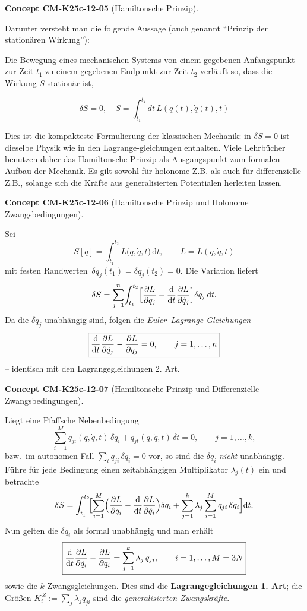 \documentclass[10pt, letterpaper]{article}
\newcommand{\CustomHeading}[3]{%
  \par\medskip\noindent%
  \textbf{#1 #2} \textnormal{(#3)}.\enskip%
}
\newenvironment{CONC}[2]{\CustomHeading{Concept}{#1}{#2}}{}
\begin{document}
\begin{CONC}{CM-K25c-12-05}{Hamiltonsche Prinzip}
Darunter versteht man die folgende Aussage (auch genannt ``Prinzip der stationären Wirkung''):

Die Bewegung eines mechanischen Systems von einem gegebenen Anfangspunkt zur Zeit $t_1$ zu einem gegebenen Endpunkt zur Zeit $t_2$ verläuft so, dass die Wirkung $S$ stationär ist,

\[\delta S = 0, \quad S = \int_{t_1}^{t_2} dt\, L(q(t), \dot{q}(t), t)\]

Dies ist die kompakteste Formulierung der klassischen Mechanik: in $\delta S = 0$ ist dieselbe Physik wie in den Lagrange-gleichungen enthalten. Viele Lehrbücher benutzen daher das Hamiltonsche Prinzip als Ausgangspunkt zum formalen Aufbau der Mechanik. Es gilt sowohl für holonome Z.B. als auch für differenzielle Z.B., solange sich die Kräfte aus generalisierten Potentialen herleiten lassen.
\end{CONC}

\begin{CONC}{CM-K25c-12-06}{Hamiltonsche Prinzip und Holonome Zwangsbedingungen}
Sei
\[
  S[q]=\int_{t_1}^{t_2} L\bigl(q,\dot q,t\bigr)\,\mathrm dt,
  \qquad
  L=L(q,\dot q,t)
\]
mit festen Randwerten
$\,\delta q_j(t_1)=\delta q_j(t_2)=0$.  
Die Variation liefert
\[
  \delta S
  =\sum_{j=1}^{n}\!
     \int_{t_1}^{t_2}
       \Bigl[
         \frac{\partial L}{\partial q_j}
        -\frac{\mathrm d}{\mathrm dt}
          \frac{\partial L}{\partial\dot q_j}
       \Bigr]
       \delta q_j\,\mathrm dt .
\]
Da die $\delta q_j$ unabhängig sind, folgen die
\emph{Euler–Lagrange-Gleichungen}
\[
  \boxed{%
    \frac{\mathrm d}{\mathrm dt}
      \frac{\partial L}{\partial\dot q_j}
    -\frac{\partial L}{\partial q_j}=0,
    \qquad j=1,\dots,n } 
\]
– identisch mit den Lagrangegleichungen 2. Art.
\end{CONC}

\begin{CONC}{CM-K25c-12-07}{Hamiltonsche Prinzip und Differenzielle Zwangsbedingungen}
Liegt eine Pfaffsche Nebenbedingung
\[
  \sum_{i=1}^{M} q_{ji}(q,\dot q,t)\,\delta q_i
  + q_{jt}(q,\dot q,t)\,\delta t =0,
  \qquad j=1,\dots,k,
\]
bzw.\ im autonomen Fall  
$\sum_{i}q_{ji}\,\delta q_i =0$ vor, so sind die $\delta q_i$
\emph{nicht} unabhängig.  
Führe für jede Bedingung einen zeitabhängigen
Multiplikator $\lambda_j(t)$ ein und betrachte
\[
  \delta S
  =\int_{t_1}^{t_2}\!
     \Bigl[
        \sum_{i=1}^{M}
          \Bigl(
            \frac{\partial L}{\partial q_i}
           -\frac{\mathrm d}{\mathrm dt}
             \frac{\partial L}{\partial\dot q_i}
          \Bigr)\delta q_i
        +\sum_{j=1}^{k}\lambda_j
          \sum_{i=1}^{M}q_{ji}\,\delta q_i
     \Bigr]\mathrm dt .
\]
Nun gelten die $\delta q_i$ als formal unabhängig und man erhält
\[
  \boxed{%
    \frac{\mathrm d}{\mathrm dt}
      \frac{\partial L}{\partial\dot q_i}
    -\frac{\partial L}{\partial q_i}
    =\sum_{j=1}^{k}\lambda_j\,q_{ji},
    \qquad i=1,\dots,M=3N } 
\]
sowie die $k$ Zwangsgleichungen.  
Dies sind die \textbf{Lagrangegleichungen 1. Art};  
die Größen
$\displaystyle
  K_i^{\,Z}:=\sum_{j}\lambda_j q_{ji}
$
sind die \emph{generalisierten Zwangskräfte}.
\end{CONC}
\end{document}
